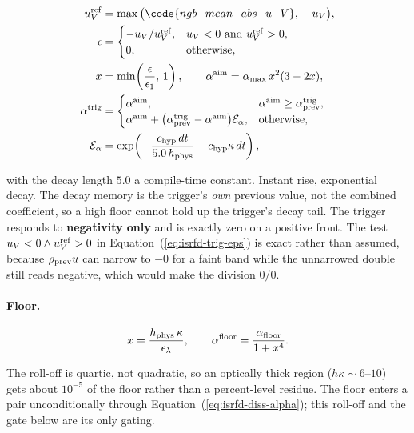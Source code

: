 \begin{align}
  u_V^{\rm ref} &= \max\big(\code{ngb\_mean\_abs\_u\_V},\ -u_V\big),
  \label{eq:isrfd-trig-ref} \\
  \epsilon &=
    \begin{cases}
      -u_V / u_V^{\rm ref}, & u_V < 0 \ \text{and}\ u_V^{\rm ref} > 0,\\
      0, & \text{otherwise},
    \end{cases}
  \label{eq:isrfd-trig-eps} \\
  x &= \min\!\left(\frac{\epsilon}{\epsilon_1},\, 1\right),
  \qquad
  \alpha^{\rm aim} = \alpha_{\max}\, x^2 (3 - 2x),
  \label{eq:isrfd-trig-aim} \\
  \alpha^{\rm trig} &=
    \begin{cases}
      \alpha^{\rm aim}, & \alpha^{\rm aim} \ge \alpha^{\rm trig}_{\rm prev},\\
      \alpha^{\rm aim} + \big(\alpha^{\rm trig}_{\rm prev} - \alpha^{\rm aim}\big)\mathcal{E}_\alpha,
        & \text{otherwise},
    \end{cases}
  \label{eq:isrfd-trig-apply} \\
  \mathcal{E}_\alpha &= \exp\!\left(
    -\frac{c_{\rm hyp}\, dt}{5.0\, h_{\rm phys}} - c_{\rm hyp}\kappa\, dt\right),
  \label{eq:isrfd-trig-decay}
\end{align}

with the decay length $5.0$ a compile-time constant. Instant rise, exponential
decay. The decay memory is the
trigger's \emph{own} previous value, not the combined coefficient, so a high floor
cannot hold up the trigger's decay tail. The trigger responds to
\textbf{negativity only} and is exactly zero on a positive front. The test
$u_V < 0 \wedge u_V^{\rm ref} > 0$ in
Equation~(\ref{eq:isrfd-trig-eps}) is exact rather than assumed, because
$\rho_{\rm prev}u$ can narrow to $-0$ for a faint band while the unnarrowed
double still reads negative, which would make the division $0/0$.

\paragraph{Floor.}

\begin{equation}
  x = \frac{h_{\rm phys}\,\kappa}{\epsilon_\lambda},
  \qquad
  \alpha^{\rm floor} = \frac{\alpha_{\rm floor}}{1 + x^4}.
  \label{eq:isrfd-floor}
\end{equation}

The roll-off is quartic, not quadratic, so an optically thick region
($h\kappa \sim 6$--$10$) gets about $10^{-5}$ of the floor rather than a
percent-level residue. The floor enters a
pair unconditionally through Equation~(\ref{eq:isrfd-diss-alpha}); this roll-off
and the gate below are its only gating.

